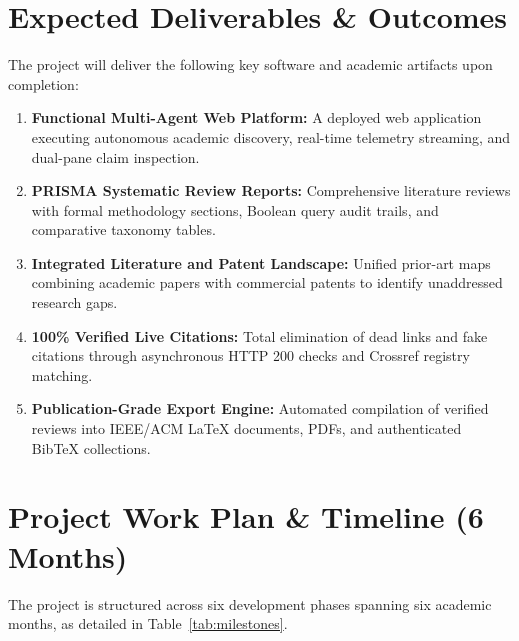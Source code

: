 \documentclass[11pt,a4paper]{article}
\begin{document}
\section{Expected Deliverables \& Outcomes}
The project will deliver the following key software and academic artifacts upon completion:
\begin{enumerate}[leftmargin=*,noitemsep]
    \item \textbf{Functional Multi-Agent Web Platform:} A deployed web application executing autonomous academic discovery, real-time telemetry streaming, and dual-pane claim inspection.
    \item \textbf{PRISMA Systematic Review Reports:} Comprehensive literature reviews with formal methodology sections, Boolean query audit trails, and comparative taxonomy tables.
    \item \textbf{Integrated Literature and Patent Landscape:} Unified prior-art maps combining academic papers with commercial patents to identify unaddressed research gaps.
    \item \textbf{100\% Verified Live Citations:} Total elimination of dead links and fake citations through asynchronous HTTP 200 checks and Crossref registry matching.
    \item \textbf{Publication-Grade Export Engine:} Automated compilation of verified reviews into IEEE/ACM LaTeX documents, PDFs, and authenticated BibTeX collections.
\end{enumerate}

\section{Project Work Plan \& Timeline (6 Months)}
The project is structured across six development phases spanning six academic months, as detailed in Table~\ref{tab:milestones}.
\end{document}
